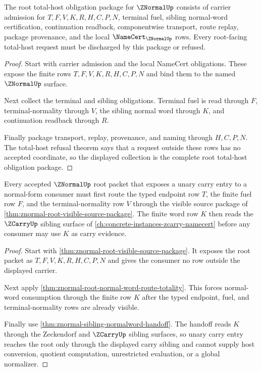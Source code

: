 \begin{theorem}
\label{thm:znormal-root-total-host-obligation-package}
The root total-host obligation package for $\ZNormalUp$ consists of carrier
admission for $T,F,V,K,R,H,C,P,N$, terminal fuel, sibling normal-word
certification, continuation readback, componentwise transport, route replay,
package provenance, and the local $\NameCert_{\ZNormalUp}$ rows. Every
root-facing total-host request must be discharged by this package or refused.
\end{theorem}
\begin{proof}
Start with carrier admission and the local NameCert obligations. These expose
the finite rows $T,F,V,K,R,H,C,P,N$ and bind them to the named $\ZNormalUp$
surface.

Next collect the terminal and sibling obligations. Terminal fuel is read
through $F$, terminal-normality through $V$, the sibling normal word through
$K$, and continuation readback through $R$.

Finally package transport, replay, provenance, and naming through $H,C,P,N$.
The total-host refusal theorem says that a request outside these rows has no
accepted coordinate, so the displayed collection is the complete root
total-host obligation package.
\end{proof}

\begin{theorem}
\label{thm:znormal-root-unary-carry-entry}
Every accepted $\ZNormalUp$ root packet that exposes a unary carry entry to a normal-form consumer must first route the typed endpoint row $T$, the finite fuel row $F$, and the terminal-normality row $V$ through the visible source package of \autoref{thm:znormal-root-visible-source-package}. The finite word row $K$ then reads the $\ZCarryUp$ sibling surface of \autoref{ch:concrete-instances-zcarry-namecert} before any consumer may use $K$ as carry evidence.
\end{theorem}
\begin{proof}
Start with \autoref{thm:znormal-root-visible-source-package}. It exposes the root packet as $T,F,V,K,R,H,C,P,N$ and gives the consumer no row outside the displayed carrier.

Next apply \autoref{thm:znormal-root-normal-word-route-totality}. This forces normal-word consumption through the finite row $K$ after the typed endpoint, fuel, and terminal-normality rows are already visible.

Finally use \autoref{thm:znormal-sibling-normalword-handoff}. The handoff reads $K$ through the Zeckendorf and $\ZCarryUp$ sibling surfaces, so unary carry entry reaches the root only through the displayed carry sibling and cannot supply host conversion, quotient computation, unrestricted evaluation, or a global normalizer.
\end{proof}

